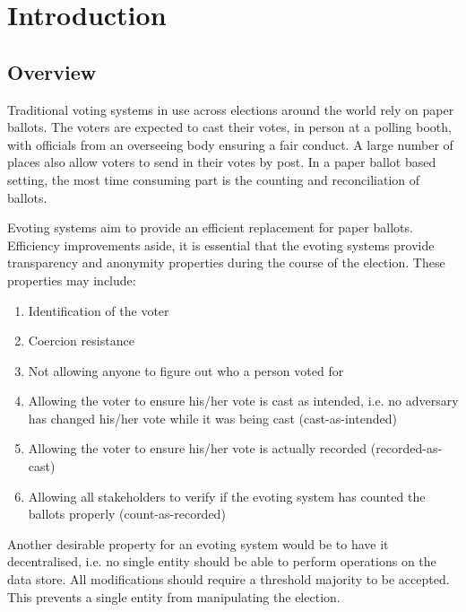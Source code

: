 
\chapter{Introduction} %

\label{Chapter1} %



\section{Overview}

Traditional voting systems in use across elections around the world rely on paper ballots. The voters are expected to cast their votes, in person at a polling booth, with officials from an overseeing body ensuring a fair conduct. A large number of places also allow voters to send in their votes by post. In a paper ballot based setting, the most time consuming part is the counting and reconciliation of ballots.

Evoting systems aim to provide an efficient replacement for paper ballots. Efficiency improvements aside, it is essential that the evoting systems provide transparency and anonymity properties during the course of the election. These properties may include:

\begin{enumerate}
\item Identification of the voter
\item Coercion resistance
\item Not allowing anyone to figure out who a person voted for
\item Allowing the voter to ensure his/her vote is cast as intended, i.e. no adversary has changed his/her vote while it was being cast (cast-as-intended)
\item Allowing the voter to ensure his/her vote is actually recorded (recorded-as-cast)
\item Allowing all stakeholders to verify if the evoting system has counted the ballots properly (count-as-recorded)
\end{enumerate}

Another desirable property for an evoting system would be to have it decentralised, i.e. no single entity should be able to perform operations on the data store. All modifications should require a threshold majority to be accepted. This prevents a single entity from manipulating the election.

